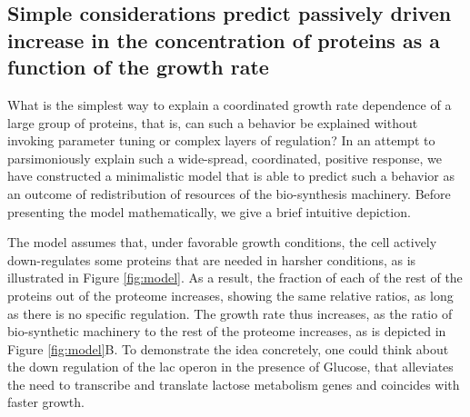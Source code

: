 \subsection{Simple considerations predict passively driven increase in the concentration of proteins as a function of the growth rate}
What is the simplest way to explain a coordinated growth rate dependence of a large group of proteins, that is, can such a behavior be explained without invoking parameter tuning or complex layers of regulation?
In an attempt to parsimoniously explain such a wide-spread, coordinated, positive response, we have constructed a minimalistic model that is able to predict such a behavior as an outcome of redistribution of resources of the bio-synthesis machinery.
Before presenting the model mathematically, we give a brief intuitive depiction.

The model assumes that, under favorable growth conditions, the cell actively down-regulates some proteins that are needed in harsher conditions, as is illustrated in Figure \ref{fig:model}.
As a result, the fraction of each of the rest of the proteins out of the proteome increases, showing the same relative ratios, as long as there is no specific regulation.
The growth rate thus increases, as the ratio of bio-synthetic machinery to the rest of the proteome increases, as is depicted in Figure \ref{fig:model}B.
To demonstrate the idea concretely, one could think about the down regulation of the lac operon in the presence of Glucose, that alleviates the need to transcribe and translate lactose metabolism genes and coincides with faster growth.